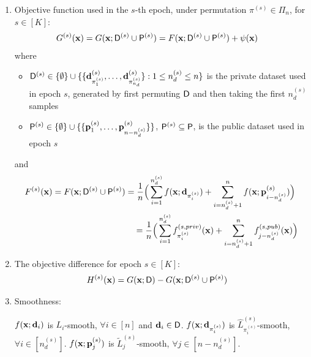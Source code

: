 \begin{enumerate}[itemsep=0mm]
    \item 
    Objective function used in the $s$-th epoch, under permutation $\pi^{(s)} \in \Pi_n$, for $s\in [K]$:
    \begin{align}
    \label{eq:appendix_surrogate_objective_def}
        &G^{(s)}({\mathbf{x}}) = G({\mathbf{x}}; {\mathsf{D}}^{(s)} \cup {\mathsf{P}}^{(s)}) = F({\mathbf{x}}; {\mathsf{D}}^{(s)} \cup {\mathsf{P}}^{(s)}) + \psi({\mathbf{x}})
    \end{align}
    where
    \begin{itemize}[itemsep=0mm]
        \item  ${\mathsf{D}}^{(s)} \in \{\emptyset\} \cup \{\{{\mathbf{d}}_{\pi_1^{(s)}}^{(s)}, \dots, {\mathbf{d}}_{\pi_{n_d}^{(s)}}^{(s)}\}: 1\leq n_d^{(s)} \leq n\}$ is the private dataset used in epoch $s$, generated by first permuting ${\mathsf{D}}$ and then taking the first $n_d^{(s)}$ samples
        \item ${\mathsf{P}}^{(s)} \in  \{\emptyset\} \cup \{\{{\mathbf{p}}_1^{(s)}, \dots, {\mathbf{p}}_{n - n_d^{(s)}}^{(s)}\}\}$, ${\mathsf{P}}^{(s)} \subseteq {\mathsf{P}}$,
        is the public dataset used in epoch $s$
    \end{itemize}
    and
    \begin{align*}
        F^{(s)}({\mathbf{x}}) = F({\mathbf{x}}; {\mathsf{D}}^{(s)} \cup {\mathsf{P}}^{(s)}) 
        &
        = \frac{1}{n} \Big(
            \sum_{i=1}^{n_d^{(s)}} f({\mathbf{x}}; {\mathbf{d}}_{\pi_i^{(s)}})
            + \sum_{i=n_d^{(s)} + 1}^{n} f({\mathbf{x}}; {\mathbf{p}}_{i-n_d^{(s)}}^{(s)})
        \Big)\\
        &\quad = \frac{1}{n} \Big(
            \sum_{i=1}^{n_d^{(s)}} f_{\pi_i^{(s)}}^{(s, priv)}({\mathbf{x}})
            + \sum_{i=n_d^{(s)} + 1}^{n} f_{j-n_d^{(s)}}^{(s, pub)}({\mathbf{x}})
        \Big)
    \end{align*}
    


    \item The objective difference for epoch $s\in [K]$: 
    \begin{align}
        H^{(s)}({\mathbf{x}}) 
        &= G({\mathbf{x}};{\mathsf{D}}) - G({\mathbf{x}};{\mathsf{D}}^{(s)} \cup {\mathsf{P}}^{(s)})
    \end{align}


    \item Smoothness:
    \begin{assumption}
    \label{ass:appendix_refined_smoothness}
    $f({\mathbf{x}}; {\mathbf{d}}_i)$ is $L_i$-smooth, $\forall i\in [n]$ and ${\mathbf{d}}_i \in {\mathsf{D}}$.
    $f({\mathbf{x}}; {\mathbf{d}}_{\pi_i^{(s)}})$ is $\widehat{L}_{\pi_i^{(s)}}^{(s)}$-smooth, $\forall i \in [n_d^{(s)}]$. 
    $f({\mathbf{x}}; {\mathbf{p}}_{j}^{(s)})$ is $\widetilde{L}_{j}^{(s)}$-smooth, $\forall j\in [n-n_d^{(s)}]$.
    \end{assumption}


\end{enumerate}
